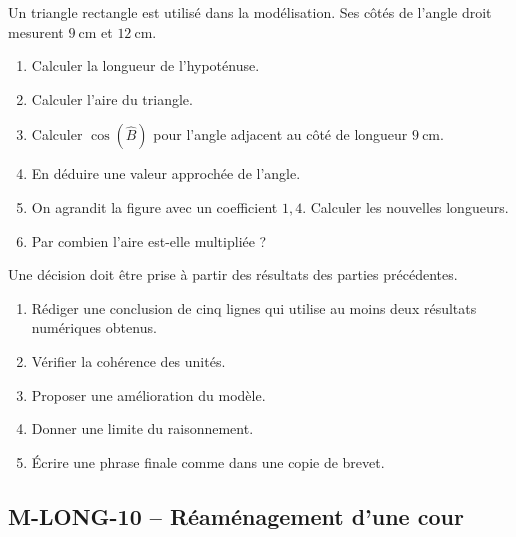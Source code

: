 \documentclass[11pt,a4paper]{article}
\newcounter{exercice}
\begin{document}
\begin{exercice}
Un triangle rectangle est utilisé dans la modélisation. Ses côtés de l'angle droit mesurent $9\ \mathrm{cm}$ et $12\ \mathrm{cm}$.
\begin{enumerate}
  \item Calculer la longueur de l'hypoténuse.
  \item Calculer l'aire du triangle.
  \item Calculer $\cos(\widehat{B})$ pour l'angle adjacent au côté de longueur $9\ \mathrm{cm}$.
  \item En déduire une valeur approchée de l'angle.
  \item On agrandit la figure avec un coefficient $1{,}4$. Calculer les nouvelles longueurs.
  \item Par combien l'aire est-elle multipliée ?
\end{enumerate}
\end{exercice}

\begin{exercice}
Une décision doit être prise à partir des résultats des parties précédentes.
\begin{enumerate}
  \item Rédiger une conclusion de cinq lignes qui utilise au moins deux résultats numériques obtenus.
  \item Vérifier la cohérence des unités.
  \item Proposer une amélioration du modèle.
  \item Donner une limite du raisonnement.
  \item Écrire une phrase finale comme dans une copie de brevet.
\end{enumerate}
\end{exercice}
\newpage
\subsection{M-LONG-10 -- Réaménagement d'une cour}
\end{document}
